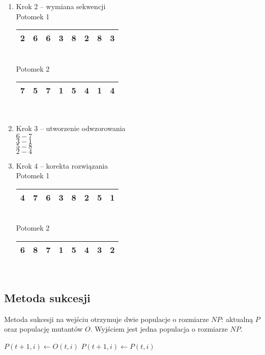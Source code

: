 \documentclass[12pt, a4paper]{article}
\begin{document}
\begin{enumerate}
 	\item Krok 2 -- wymiana sekwencji\\
Potomek 1
\begin{tabular}{ | c | c | c | c | c | c | c | c |}
  \hline
  2 & 6 & \cellcolor{blue!25}6 & \cellcolor{blue!25}3 & \cellcolor{blue!25}8 & \cellcolor{blue!25}2 & 8 & 3 \\ \hline
\end{tabular}\\

Potomek 2
\begin{tabular}{ | c | c | c | c | c | c | c | c |}
  \hline
  7 & 5 &  \cellcolor{green!25}7 & \cellcolor{green!25}1 & \cellcolor{green!25}5 & \cellcolor{green!25}4 & 1 & 4 \\ \hline
\end{tabular}\\

\item Krok 3 -- utworzenie odwzorowania\\
$6 - 7$\\
$3 - 1$\\
$5 - 8$\\
$2 - 4$\\

\item Krok 4 -- korekta rozwiązania\\
Potomek 1
\begin{tabular}{ | c | c | c | c | c | c | c | c |}
  \hline
  4 & 7 & \cellcolor{blue!25}6 & \cellcolor{blue!25}3 & \cellcolor{blue!25}8 & \cellcolor{blue!25}2 & 5 & 1 \\ \hline
\end{tabular}\\

Potomek 2
\begin{tabular}{ | c | c | c | c | c | c | c | c |}
  \hline
  6 & 8 &  \cellcolor{green!25}7 & \cellcolor{green!25}1 & \cellcolor{green!25}5 & \cellcolor{green!25}4 & 3 & 2 \\ \hline
\end{tabular}\\
\end{enumerate}

\subsection{Metoda sukcesji}

Metoda sukcesji na wejściu otrzymuje dwie populacje o rozmiarze $NP$: aktualną $P$ oraz populację mutantów $O$.
Wyjściem jest jedna populacja o rozmiarze $NP$.

\begin{algorithm}[!htb]
\begin{algorithmic}[1]
      \State $P(t+1, i) \gets O(t, i)$
    \Else
      \State $P(t+1, i) \gets P(t, i)$
    \EndIf
  \EndFor
\EndFunction
\end{algorithmic}
\end{algorithm}

\nocite{*}


\end{document}
